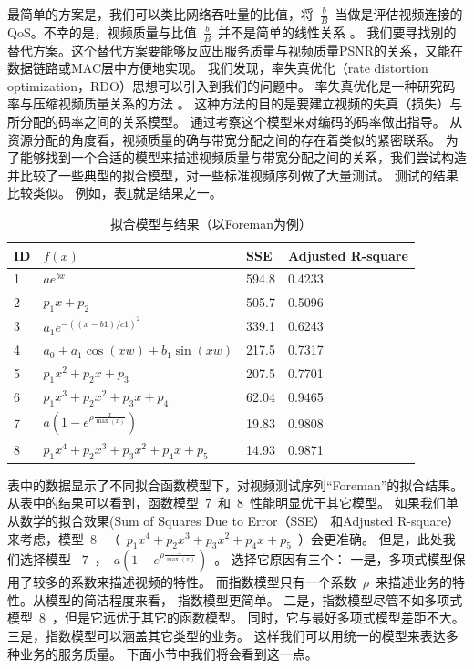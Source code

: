\begin{enumerate}[(1)]
最简单的方案是，我们可以类比网络吞吐量的比值，将~$\frac{b}{B}$~当做是评估视频连接的QoS。不幸的是，视频质量与比值~$\frac{b}{B}$~并不是简单的线性关系
 \cite{He1013856}。
我们要寻找别的替代方案。这个替代方案要能够反应出服务质量与视频质量PSNR的关系，又能在数据链路或MAC层中方便地实现。
我们发现，率失真优化（rate distortion optimization，RDO）思想可以引入到我们的问题中。
率失真优化是一种研究码率与压缩视频质量关系的方法
\cite{He1013856}\cite{E-H-Yang.TIP.2007} \cite{J-Y-Liu.ICIP.2009} 。
这种方法的目的是要建立视频的失真（损失）与所分配的码率之间的关系模型。
通过考察这个模型来对编码的码率做出指导。
从资源分配的角度看，视频质量的确与带宽分配之间的存在着类似的紧密联系。
为了能够找到一个合适的模型来描述视频质量与带宽分配之间的关系，我们尝试构造并比较了一些典型的拟合模型，对一些标准视频序列做了大量测试。 测试的结果比较类似。 例如，表\ref{tb:chap_cacop:fit_functions}就是结果之一。
\begin{table}[tb]
\caption{拟合模型与结果（以Foreman为例）} 
\label{tb:chap_cacop:fit_functions}
\centering
\wuhao
\begin{tabularx}{0.99\linewidth}{p{}p{}p{}p{}}
\toprule
ID& $f(x)$ & SSE & Adjusted R-square\\
\midrule
1&$ae^{bx}$ & 594.8 &0.4233\\
2&$p_1 x + p_2$ & 505.7 & 0.5096\\
3&$a_1e^{-((x-b1)/c1)^2}$&339.1&0.6243\\
4&$a_0 + a_1\cos(xw) + b_1\sin(xw)$&217.5&0.7317\\
5&$p_1x^2 + p_2x + p_3$ &207.5 & 0.7701\\
6&$p_1x^3 + p_2x^2 + p_3x + p_4$&62.04&0.9465\\
7&$a(1-e^{ \rho \frac{x}{\max(x)}})$ &19.83 & 0.9808\\
8&$p_1x^4 + p_2x^3 + p_3x^2 + p_4x + p_5$&14.93 &0.9871\\
\bottomrule
\end{tabularx}
\end{table}
表中的数据显示了不同拟合函数模型下，对视频测试序列“Foreman”的拟合结果。
从表中的结果可以看到，函数模型~$7$~和~$8$~性能明显优于其它模型。
如果我们单从数学的拟合效果(Sum of Squares Due to Error（SSE） 和Adjusted R-square）来考虑，模型~$8$~ （~$p_1x^4 + p_2x^3 + p_3x^2 + p_4x + p_5$~）会更准确。
但是，此处我们选择模型 ~$7$~，~$a(1-e^{ \rho \frac{x}{\max(x)}})$~。 
选择它原因有三个：
一是，多项式模型保用了较多的系数来描述视频的特性。
而指数模型只有一个系数~$\rho$~来描述业务的特性。从模型的简洁程度来看，
指数模型更简单。
二是，指数模型尽管不如多项式模型~$8$~，但是它远优于其它的函数模型。
同时，它与最好多项式模型差距不大。
三是，指数模型可以涵盖其它类型的业务。
这样我们可以用统一的模型来表达多种业务的服务质量。
下面小节中我们将会看到这一点。


\end{enumerate}
